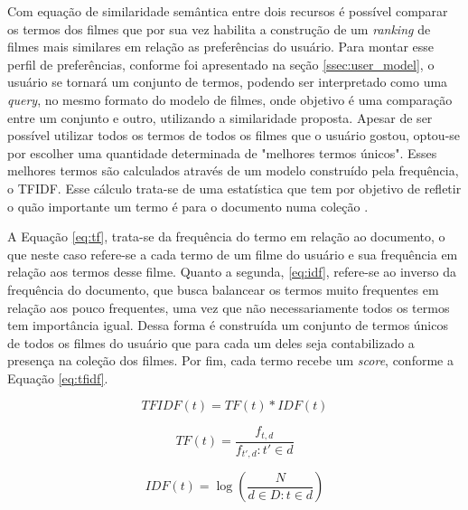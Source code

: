 Com equação de similaridade semântica entre dois recursos é possível comparar os termos dos filmes que por sua vez habilita a construção de um \textit{ranking} de filmes mais similares em relação as preferências do usuário. Para montar esse perfil de preferências, conforme foi apresentado na seção \ref{ssec:user_model}, o usuário se tornará um conjunto de termos, podendo ser interpretado como uma \textit{query}, no mesmo formato do modelo de filmes, onde objetivo é uma comparação entre um conjunto e outro, utilizando a similaridade proposta. Apesar de ser possível utilizar todos os termos de todos os filmes que o usuário gostou, optou-se por escolher uma quantidade determinada de "melhores termos únicos". Esses melhores termos são calculados através de um modelo construído pela frequência, o \ac{TFIDF}. Esse cálculo trata-se de uma estatística que tem por objetivo de refletir o quão importante um termo é para o documento numa coleção \citep{rajaraman_ullman_2011}.

A Equação \ref{eq:tf}, trata-se da frequência do termo em relação ao documento, o que neste caso refere-se a cada termo de um filme do usuário e sua frequência em relação aos termos desse filme. Quanto a segunda, \ref{eq:idf}, refere-se ao inverso da frequência do documento, que busca balancear os termos muito frequentes em relação aos pouco frequentes, uma vez que não necessariamente todos os termos tem importância igual. Dessa forma é construída um conjunto de termos únicos de todos os filmes do usuário que para cada um deles seja contabilizado a presença na coleção dos filmes. Por fim, cada termo recebe um \textit{score}, conforme a Equação {\ref{eq:tfidf}}.

\begin{equation}
	TFIDF(t) = TF(t) * IDF(t)
\label{eq:tfidf}
\end{equation}

\begin{equation}
	TF(t) = \frac{f_{t,d}}{f_{t',d} : t' \in d}
\label{eq:tf}
\end{equation}

\begin{equation}
	IDF(t) = \log (\frac{N}{d \in D : t \in d})
\label{eq:idf}
\end{equation}

